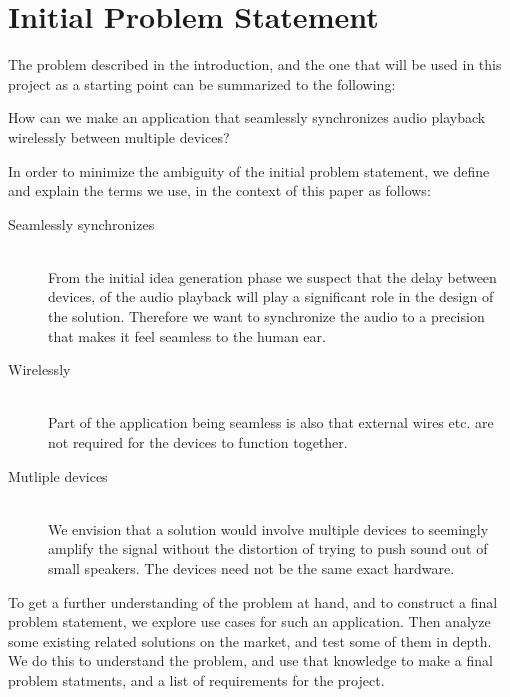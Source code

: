 \section{Initial Problem Statement}\label{sec:initial_problem}

The problem described in the introduction, and the one that will be used
in this project as a starting point can be summarized to the following:

\begin{problemstatement}
    How can we make an application that seamlessly synchronizes audio
    playback wirelessly between multiple devices?
\end{problemstatement}

\noindent
In order to minimize the ambiguity of the initial problem statement, 
we define and explain the terms we use, in the context of this paper as follows:

\begin{description}
    \item[Seamlessly synchronizes]  \hfill \\
        From the initial idea generation phase we suspect
        that the delay between devices, of the audio playback will
        play a significant role in the design of the solution. Therefore we
        want to synchronize the audio to a precision that makes it feel
        seamless to the human ear.
    \item[Wirelessly]  \hfill \\
        Part of the application being seamless is also that external wires etc. are
        not required for the devices to function together.
    \item[Mutliple devices]  \hfill \\
        We envision that a solution would involve multiple devices to seemingly 
        amplify the signal without the distortion of trying to push sound out of
        small speakers. The devices need not be the same exact hardware.
\end{description}

To get a further understanding of the problem at hand, and to
construct a final problem statement, we explore use
cases for such an application. 
Then analyze some existing related solutions on the market, 
and test some of them in depth. 
We do this to understand the problem, and use that knowledge
to make a final problem statments, and a list of requirements for the project. 
